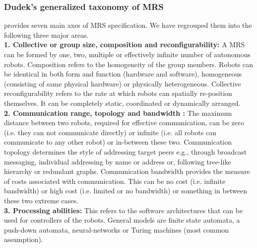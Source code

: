 \subsubsection*{Dudek's generalized taxonomy of MRS}
 provides seven main axes of MRS specification. We have regrouped them into the following three major areas.\\
\textbf{1. Collective or group size, composition and reconfigurability: }  A MRS can be formed by one, two, multiple or effectively infinite number of autonomous robots. Composition refers to the homogeneity of the group members. Robots can be identical in both form and function (hardware and software), homogeneous (consisting of same physical hardware) or physically heterogeneous. Collective reconfigurability refers to the rate at which robots can spatially re-position themselves. It can be completely static, coordinated or dynamically arranged.\\
\textbf{2. Communication range, topology and bandwidth : } The maximum distance between two robots, required for effective communication, can be zero (i.e. they can not communicate directly) or infinite (i.e. all robots can communicate to any other robot) or in-between these two. Communication topology determines the style of addressing target peers e.g., through broadcast messaging, individual addressing by name or address or, following tree-like hierarchy or redundant graphs. Communication bandwidth provides the measure of costs associated with communication. This can be no cost (i.e. infinite bandwidth) or high cost (i.e. limited or no bandwidth) or something in between these two extreme cases.\\
\textbf{3. Processing abilities: } This refers to the software architectures that can be used for controllers of the robots. General models are finite state automata, a push-down automata, neural-networks or Turing machines (most common assumption). 
